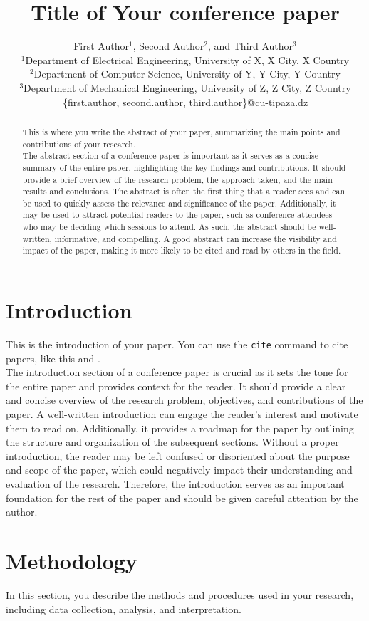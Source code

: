 \documentclass{IEEEtran}
\title{Title of Your conference paper}
\author{First Author$^1$, Second Author$^2$, and Third Author$^3$\\
    $^1$Department of Electrical Engineering, University of X, X City, X Country\\
    $^2$Department of Computer Science, University of Y, Y City, Y Country\\
    $^3$Department of Mechanical Engineering, University of Z, Z City, Z Country\\
    \{first.author, second.author, third.author\}@cu-tipaza.dz}
\begin{document}
\maketitle

\begin{abstract}
This is where you write the abstract of your paper, summarizing the main points and contributions of your research.\\
The abstract section of a conference paper is important as it serves as a concise summary of the entire paper, highlighting the key findings and contributions. It should provide a brief overview of the research problem, the approach taken, and the main results and conclusions. The abstract is often the first thing that a reader sees and can be used to quickly assess the relevance and significance of the paper. Additionally, it may be used to attract potential readers to the paper, such as conference attendees who may be deciding which sessions to attend. As such, the abstract should be well-written, informative, and compelling. A good abstract can increase the visibility and impact of the paper, making it more likely to be cited and read by others in the field.
\end{abstract}

\section{Introduction}
This is the introduction of your paper. You can use the \texttt{cite} command to cite papers, like this \cite{article1} and \cite{inproceedings1}.\\
The introduction section of a conference paper is crucial as it sets the tone for the entire paper and provides context for the reader. It should provide a clear and concise overview of the research problem, objectives, and contributions of the paper. A well-written introduction can engage the reader's interest and motivate them to read on. Additionally, it provides a roadmap for the paper by outlining the structure and organization of the subsequent sections. Without a proper introduction, the reader may be left confused or disoriented about the purpose and scope of the paper, which could negatively impact their understanding and evaluation of the research. Therefore, the introduction serves as an important foundation for the rest of the paper and should be given careful attention by the author.

\section{Methodology}
In this section, you describe the methods and procedures used in your research, including data collection, analysis, and interpretation\cite{YOUSFI2017789}.
\end{document}
